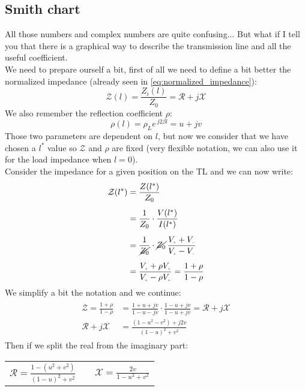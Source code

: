 \subsection*{Smith chart}
All those numbers and complex numbers are quite confusing... But what if I tell you that there is a graphical way to describe the transmission line and all the useful coefficient.\\
We need to prepare ourself a bit, first of all we need to define a bit better the normalized impedance (already seen in \cref{eq:normalized_impedance}):
\begin{equation}
    \mathcal{Z}(l)=\frac{Z_i(l)}{Z_0}=\mathcal{R}+j\mathcal{X}
\end{equation}
We also remember the reflection coefficient $\rho$:
\begin{equation}
    \rho(l)=\rho_L e^{\,j2\beta l}=u+jv
\end{equation}
Those two parameters are dependent on $l$, but now we consider that we have chosen a $l^*$ value so $\mathcal{Z}$ and $\rho$ are fixed (very flexible notation, we can also use it for the load impedance when $l=0$).\\
Consider the impedance for a given position on the TL and we can now write:
\begin{align}
    \begin{split}
        \mathcal{Z}(l^*) &=\frac{Z(l^*)}{Z_0}\\[5pt]
        &=\frac{1}{Z_0}\cdot \frac{V(l^*)}{I(l^*)}\\[5pt]
        &=\frac{1}{\cancel{Z_0}}\cdot \cancel{Z_0} \,\frac{V\bottomPlus +V\bottomMinus }{V\bottomPlus -V\bottomMinus }\\[5pt]
        &= \frac{V\bottomPlus +\rho V\bottomPlus }{V\bottomPlus -\rho V\bottomPlus } = \frac{1 +\rho }{1 -\rho }
    \end{split}
\end{align}
We simplify a bit the notation and we continue:
\begin{align}
    \begin{split}
        \mathcal{Z} =\frac{1+\rho}{1-\rho}& =\frac{1+u+jv}{1-u-jv}\cdot \frac{1-u+jv}{ 1-u+jv}=\mathcal{R}+j\mathcal{X}\\[5pt]
        \mathcal{R}+j\mathcal{X}&=\frac{(1-u^2-v^2)+j2v}{(1-u)^2+v^2}
    \end{split}
\end{align}
Then if we split the real from the imaginary part:
\begin{center}
    \begin{tabular}{ c c c }
        $\mathcal{R}=\frac{1-(u^2+v^2)}{(1-u)^2+v^2}$&
        &
        $\mathcal{X}=\frac{2v}{1-u^2+v^2}$
    \end{tabular}
\end{center}
